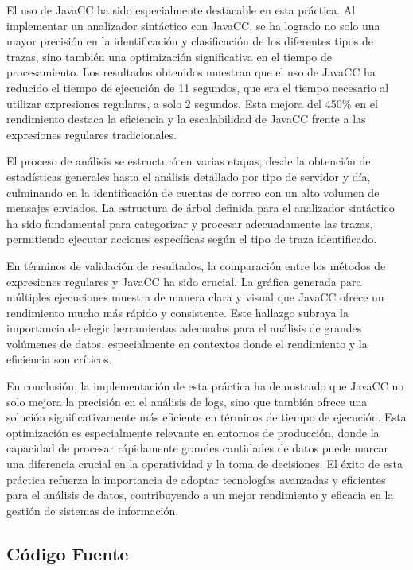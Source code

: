 El uso de JavaCC ha sido especialmente destacable en esta práctica. Al implementar un analizador sintáctico con JavaCC, se ha logrado no solo una mayor precisión en la identificación y clasificación de los diferentes tipos de trazas, sino también una optimización significativa en el tiempo de procesamiento. Los resultados obtenidos muestran que el uso de JavaCC ha reducido el tiempo de ejecución de 11 segundos, que era el tiempo necesario al utilizar expresiones regulares, a solo 2 segundos. Esta mejora del 450\% en el rendimiento destaca la eficiencia y la escalabilidad de JavaCC frente a las expresiones regulares tradicionales.

El proceso de análisis se estructuró en varias etapas, desde la obtención de estadísticas generales hasta el análisis detallado por tipo de servidor y día, culminando en la identificación de cuentas de correo con un alto volumen de mensajes enviados. La estructura de árbol definida para el analizador sintáctico ha sido fundamental para categorizar y procesar adecuadamente las trazas, permitiendo ejecutar acciones específicas según el tipo de traza identificado.

En términos de validación de resultados, la comparación entre los métodos de expresiones regulares y JavaCC ha sido crucial. La gráfica generada para múltiples ejecuciones muestra de manera clara y visual que JavaCC ofrece un rendimiento mucho más rápido y consistente. Este hallazgo subraya la importancia de elegir herramientas adecuadas para el análisis de grandes volúmenes de datos, especialmente en contextos donde el rendimiento y la eficiencia son críticos.

En conclusión, la implementación de esta práctica ha demostrado que JavaCC no solo mejora la precisión en el análisis de logs, sino que también ofrece una solución significativamente más eficiente en términos de tiempo de ejecución. Esta optimización es especialmente relevante en entornos de producción, donde la capacidad de procesar rápidamente grandes cantidades de datos puede marcar una diferencia crucial en la operatividad y la toma de decisiones. El éxito de esta práctica refuerza la importancia de adoptar tecnologías avanzadas y eficientes para el análisis de datos, contribuyendo a un mejor rendimiento y eficacia en la gestión de sistemas de información.

\subsection{Código Fuente}

